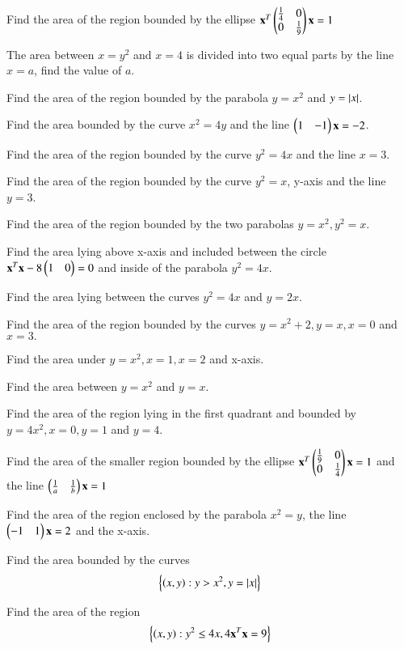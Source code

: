 \item  Find the area of the region bounded by the ellipse 
$
\mathbf{x}^T\begin{pmatrix}\frac{1}{4} & 0 \\ 0 & \frac{1}{9}\end{pmatrix}\mathbf{x} = 1
$
\item The area between $x=y^2$ and $x=4$ is divided into two equal parts by the line $x=a$, find the value of $a$.
\item  Find the area of the region bounded by the parabola $y = x^2$ and $y = \left\vert x\right\vert$.
\item  Find the area bounded by the curve $x^2 = 4y$ and the line $\begin{pmatrix}1 & -1\end{pmatrix}\mathbf{x} = -2$.
\item  Find the area of the region bounded by the curve $y^2 = 4x$ and the line $x = 3$.
%
\item Find the area of the region bounded by the curve $y^2 = x$, y-axis and the line $y = 3$.
%
\item Find the area of the region bounded by the two parabolas $y = x^2, y^2=x$.
\item Find the area lying above x-axis and included between the circle $\mathbf{x}^T\mathbf{x} -8\begin{pmatrix}1 & 0\end{pmatrix}= 0$  and inside of the parabola $y^2 = 4x$.
\item Find the area lying between the curves $y^2 = 4x$ and $y = 2x$.
\item  Find the area of the region bounded by the curves $y = x^2+2, y = x, x = 0$ and $ x = 3.$
%
\item Find the area under $y = x^2, x = 1, x = 2$ and x-axis.
\item Find the area between  $y = x^2$ and $y = x$.
\item Find the area of the region lying in the first quadrant and bounded by $y = 4x^2, x = 0, y = 1$ and $y = 4$.
\item Find the area of the smaller region bounded by the ellipse
$
\mathbf{x}^T\begin{pmatrix}\frac{1}{9} & 0 \\ 0 & \frac{1}{4}\end{pmatrix}\mathbf{x} = 1
$
and the line 
$
\begin{pmatrix}\frac{1}{a} & \frac{1}{b}\end{pmatrix}\mathbf{x} = 1
$
\item Find the area of the region enclosed by the parabola $x^2=y$, the line $\begin{pmatrix}-1 & 1\end{pmatrix}\mathbf{x} = 2$ and the x-axis.
%
\item Find the area bounded by the curves
\begin{align}
\left\{\left(x,y\right) : y > x^2, y = \left\vert x\right\vert\right\}
\end{align}
%
\item Find the area of the region
\begin{align}
\left\{\left(x,y\right) : y^2 \le 4x, 4\mathbf{x}^T\mathbf{x} = 9\right\}
\end{align}
